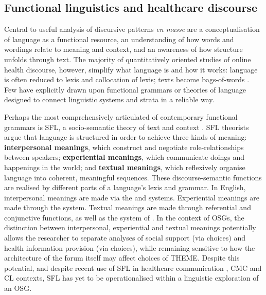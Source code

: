 \subsection{Functional linguistics and healthcare discourse}

Central to useful analysis of discursive patterns \emph{en masse} are a conceptualisation of language as a functional resource, an understanding of how words and wordings relate to meaning and context, and an awareness of how structure unfolds through text. The majority of quantitatively oriented studies of online health discourse, however, simplify what language is and how it works: language is often reduced to lexis and collocation of lexis; texts become bags\hyp{}of\hyp{}words \cite[e.g.][]{maclean_forum77:_2015,yesha_method_2015}. Few have explicitly drawn upon functional grammars or theories of language designed to connect linguistic systems and strata in a reliable way.

Perhaps the most comprehensively articulated of contemporary functional grammars \cite{eggins_analysing_2004} is \gls{SFL}, a socio\hyp{}semantic theory of text and context \cite{halliday_introduction:_2004}. \gls{SFL} theorists argue that language is structured in order to achieve three kinds of meaning: \textbf{interpersonal meanings}, which construct and negotiate role\hyp{}relationships between speakers; \textbf{experiential meanings}, which communicate doings and happenings in the world; and \textbf{textual meanings}, which reflexively organise language into coherent, meaningful sequences. These \gls{discourse-semantic} functions are realised by different parts of a language's lexis and grammar. In English, interpersonal meanings are made via the  and  systems. Experiential meanings are made through the  system. Textual meanings are made through referential and conjunctive functions, as well as the system of . In the context of \glspl{OSG}, the distinction between interpersonal, experiential and textual meanings potentially allows the researcher to separate analyses of social support (via  choices) and health information provision (via  choices), while remaining sensitive to how the architecture of the \gls{forum} itself may affect choices of \gls{THEME}. Despite this potential, and despite recent use of \gls{SFL} in healthcare communication \cite{matthiessen_applying_2013,slade_communicating_2015,woodward-kron_international_2016}, \gls{CMC} \cite{lander_building_2014,zappavigna_enacting_2013} and \gls{CL} \cite{hunston_systemic_2013,thompson_system_2014} contexts, \gls{SFL} has yet to be operationalised within a linguistic exploration of an \gls{OSG}.

